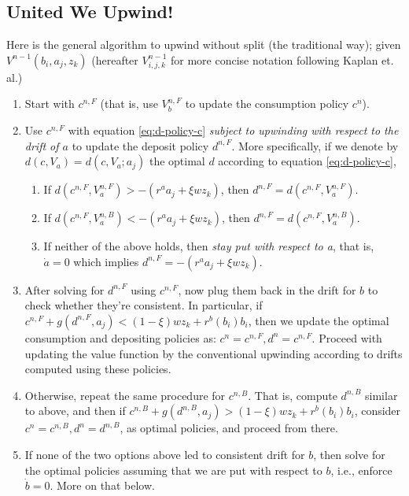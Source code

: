 \documentclass[11pt]{article}
\begin{document}
\subsection{United We Upwind!}
\label{sec:orga50c78c}
Here is the general algorithm to upwind without split (the traditional way); given \(V^{n-1}(b_i,a_j,z_k)\) (hereafter \(V_{i,j,k}^{n-1}\) for more concise notation following Kaplan et. al.)
\begin{enumerate}
\item Start with \(c^{n,F}\) (that is, use \(V_b^{n,F}\) to update the consumption policy \(c^n\)).
\item Use \(c^{n,F}\) with equation \eqref{eq:d-policy-c} \emph{subject to upwinding with respect to the drift of \(a\)} to update the deposit policy \(d^{n,F}\). More specifically, if we denote by \(d(c,V_a)=d(c,V_a;a_j)\) the optimal \(d\) according to equation \eqref{eq:d-policy-c},
\begin{enumerate}
\item If \(d(c^{n,F}, V_a^{n,F}) > -(r^a a_j + \xi w z_k)\), then \(d^{n,F} = d(c^{n,F}, V_{a}^{n,F})\).
\item If \(d(c^{n,F}, V_a^{n,B}) < -(r^a a_j + \xi w z_k)\), then \(d^{n,F} = d(c^{n,F}, V_{a}^{n,B})\).
\item If neither of the above holds, then \emph{stay put with respect to a}, that is, \(\dot{a} = 0\) which implies \(d^{n,F} = - (r^a a_j + \xi w z_k)\).
\end{enumerate}
\item After solving for \(d^{n,F}\) using \(c^{n,F}\), now plug them back in the drift for \(b\) to check whether they're consistent. In particular, if \(c^{n,F} + g(d^{n,F}, a_j) < (1-\xi) w z_k + r^b(b_i) b_i\), then we update the optimal consumption and depositing policies as: \(c^n = c^{n,F}, d^n = c^{n,F}\). Proceed with updating the value function by the conventional upwinding according to drifts computed using these policies.
\item Otherwise, repeat the same procedure for \(c^{n,B}\). That is, compute \(d^{n,B}\) similar to above, and then if \(c^{n,B} + g(d^{n,B}, a_j) > (1-\xi) w z_k + r^b(b_i) b_i\), consider \(c^n = c^{n,B}, d^n = d^{n,B}\), as optimal policies, and proceed from there.
\item If none of the two options above led to consistent drift for \(b\), then solve for the optimal policies assuming that we are put with respect to \(b\), i.e., enforce \(\dot{b} = 0\). More on that below.
\end{enumerate}
\end{document}
